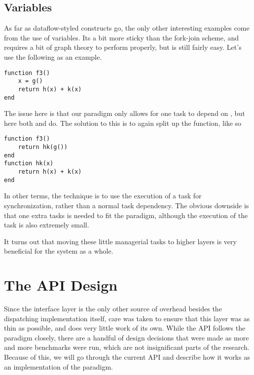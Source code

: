 \documentclass{article}
\begin{document}
\subsection{Variables}
As far as dataflow-styled constructs go, the only other interesting examples come from the use of variables. Its a bit more sticky than the fork-join scheme, and requires a bit of graph theory to perform properly, but is still fairly easy. Let's use the following as an example.
\begin{verbatim}
function f3()
    x = g()
    return h(x) + k(x)
end
\end{verbatim}
The issue here is that our paradigm only allows for one task to depend on , but here both  and  do. The solution to this is to again split up the function, like so
\begin{verbatim}
function f3()
    return hk(g())
end
function hk(x)
    return h(x) + k(x)
end
\end{verbatim}
In other terms, the technique is to use the execution of a task for synchronization, rather than a normal task dependency. The obvious downside is that one extra tasks is needed to fit the paradigm, although the execution of the task is also extremely small.

It turns out that moving these little managerial tasks to higher layers is very beneficial for the system as a whole.

\section{The API Design}
Since the interface layer is the only other source of overhead besides the dispatching implementation itself, care was taken to ensure that this layer was as thin as possible, and does very little work of its own. While the API follows the paradigm closely, there are a handful of design decisions that were made as more and more benchmarks were run, which are not insignificant parts of the research. Because of this, we will go through the current API and describe how it works as an implementation of the paradigm.
\end{document}
